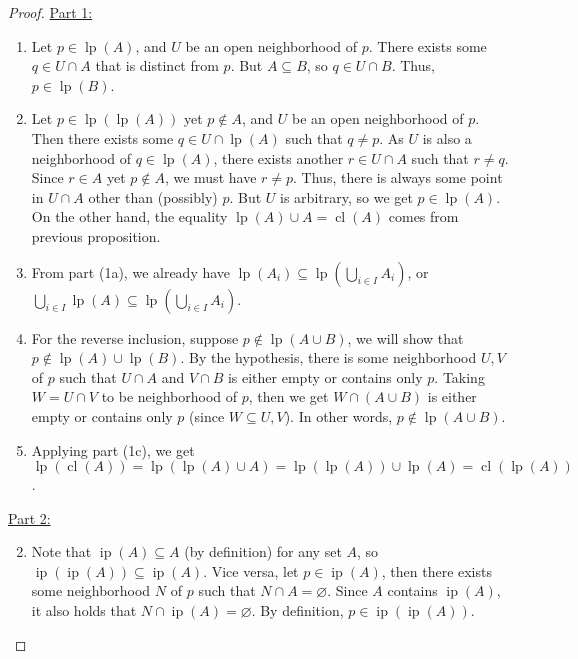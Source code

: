 \documentclass{treatise}
\begin{document}
\begin{proof}
\underline{Part 1:}
\begin{enumerate}[label=(\alph*)]
    \item Let $p \in \operatorname{lp}(A)$, and $U$ be an open neighborhood of $p$. There exists some $q \in U \cap A$ that is distinct from $p$. But $A \subseteq B$, so $q \in U \cap B$. Thus, $p \in \operatorname{lp}(B)$.
    \item Let $p \in \operatorname{lp}(\operatorname{lp}(A))$ yet $p \notin A$, and $U$ be an open neighborhood of $p$. Then there exists some $q \in U \cap \operatorname{lp}(A)$ such that $q \neq p$. As $U$ is also a neighborhood of $q \in \operatorname{lp}(A)$, there exists another $r \in U \cap A$ such that $r \neq q$. Since $r \in A$ yet $p \notin A$, we must have $r \neq p$. Thus, there is always some point in $U \cap A$ other than (possibly) $p$. But $U$ is arbitrary, so we get $p \in \operatorname{lp}(A)$. On the other hand, the equality $\operatorname{lp}(A) \cup A = \operatorname{cl}(A)$ comes from previous proposition.
    \item From part (1a), we already have $\operatorname{lp}(A_i) \subseteq \operatorname{lp} \left( \bigcup_{i \in I} A_i \right)$, or $\bigcup_{i \in I} \operatorname{lp}(A) \subseteq \operatorname{lp} \left( \bigcup_{i \in I} A_i \right)$.
    \item For the reverse inclusion, suppose $p \notin \operatorname{lp}(A \cup B)$, we will show that $p \notin \operatorname{lp}(A) \cup \operatorname{lp}(B)$. By the hypothesis, there is some neighborhood $U, V$ of $p$ such that $U \cap A$ and $V \cap B$ is either empty or contains only $p$. Taking $W = U \cap V$ to be neighborhood of $p$, then we get $W \cap (A \cup B)$ is either empty or contains only $p$ (since $W \subseteq U, V$). In other words, $p \notin \operatorname{lp}(A \cup B)$.
    \item Applying part (1c), we get $\operatorname{lp}(\operatorname{cl}(A)) = \operatorname{lp}(\operatorname{lp}(A) \cup A) = \operatorname{lp}(\operatorname{lp}(A)) \cup \operatorname{lp}(A) = \operatorname{cl}(\operatorname{lp}(A))$.
\end{enumerate}
\underline{Part 2:}
\begin{enumerate}[label=(\alph*)]
\setcounter{enumi}{1}
    \item Note that $\operatorname{ip}(A) \subseteq A$ (by definition) for any set $A$, so $\operatorname{ip}(\operatorname{ip}(A)) \subseteq \operatorname{ip}(A)$. Vice versa, let $p \in \operatorname{ip}(A)$, then there exists some neighborhood $N$ of $p$ such that $N \cap A = \varnothing$. Since $A$ contains $\operatorname{ip}(A)$, it also holds that $N \cap \operatorname{ip}(A) = \varnothing$. By definition, $p \in \operatorname{ip}(\operatorname{ip}(A))$.

\end{enumerate}
\end{proof}
\end{document}
